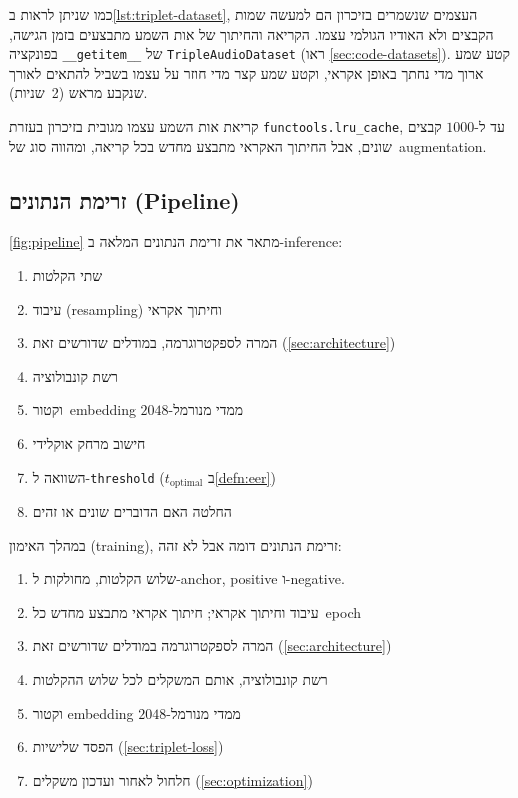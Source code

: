 \documentclass[hebrew, a4paper]{article}
\theoremstyle{plain}
\theoremstyle{definition}
\numberwithin{equation}{section}
\begin{document}
כמו שניתן לראות ב\autoref{lst:triplet-dataset}, העצמים שנשמרים בזיכרון
הם למעשה שמות הקבצים ולא האודיו הגולמי עצמו. הקריאה והחיתוך של אות
השמע מתבצעים בזמן הגישה, בפונקציה \verb|__getitem__| של
\verb|TripleAudioDataset| (ראו
\autoref{sec:code-datasets}). קטע שמע ארוך מדי נחתך באופן
אקראי, וקטע שמע קצר מדי חוזר על עצמו בשביל להתאים לאורך שנקבע מראש
(2~שניות).

קריאת אות השמע עצמו מגובית בזיכרון בעזרת \verb|functools.lru_cache|,
עד ל-$\num{1000}$ קבצים שונים, אבל החיתוך האקראי מתבצע מחדש בכל קריאה,
ומהווה סוג של~augmentation.

\subsection{זרימת הנתונים (Pipeline)}
\label{sec:data-pipeline}

\autoref{fig:pipeline} מתאר את זרימת הנתונים המלאה ב-inference:
\begin{enumerate}
\item שתי הקלטות
\item עיבוד (resampling) וחיתוך אקראי
\item המרה לספקטרוגרמה, במודלים שדורשים זאת (\autoref{sec:architecture})
\item רשת קונבולוציה
\item וקטור~embedding $2048$-ממדי מנורמל
\item חישוב מרחק אוקלידי
\item השוואה ל-\textenglish{\texttt{threshold}}
  ($t_{\mathrm{optimal}}$ ב\autoref{defn:eer})
\item החלטה האם הדוברים שונים או זהים
\end{enumerate}

במהלך האימון (training), זרימת הנתונים דומה אבל לא זהה:
\begin{enumerate}
\item שלוש הקלטות, מחולקות ל-\textenglish{anchor},
  \textenglish{positive} ו-\textenglish{negative}.
\item עיבוד וחיתוך אקראי; חיתוך אקראי מתבצע מחדש כל~epoch
\item המרה לספקטרוגרמה במודלים שדורשים זאת (\autoref{sec:architecture})
\item רשת קונבולוציה, אותם המשקלים לכל שלוש ההקלטות
\item וקטור embedding $2048$-ממדי מנורמל
\item הפסד שלישיות (\autoref{sec:triplet-loss})
\item חלחול לאחור ועדכון משקלים (\autoref{sec:optimization})
\end{enumerate}
\end{document}
